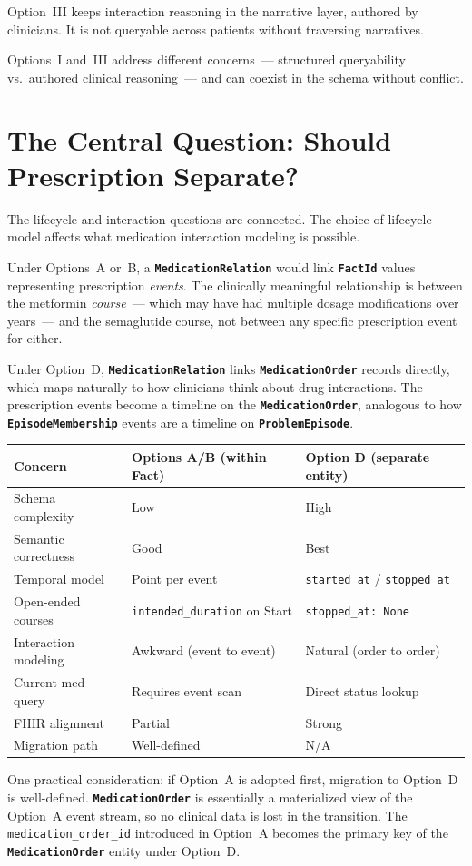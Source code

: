 \documentclass[11pt]{article}
\newcommand{\entity}[1]{\texttt{\textbf{#1}}}
\newcommand{\field}[1]{\texttt{#1}}
\begin{document}
Option~III keeps interaction reasoning in the narrative layer, authored
by clinicians. It is not queryable across patients without traversing
narratives.

Options~I and~III address different concerns~--- structured
queryability vs.\ authored clinical reasoning~--- and can coexist in
the schema without conflict.

\section{The Central Question: Should Prescription Separate?}
\label{sec:separation}

The lifecycle and interaction questions are connected. The choice of
lifecycle model affects what medication interaction modeling is
possible.

Under Options~A or~B, a \entity{MedicationRelation} would link
\entity{FactId} values representing prescription \emph{events}. The
clinically meaningful relationship is between the metformin
\emph{course}~--- which may have had multiple dosage modifications
over years~--- and the semaglutide course, not between any specific
prescription event for either.

Under Option~D, \entity{MedicationRelation} links
\entity{MedicationOrder} records directly, which maps naturally to
how clinicians think about drug interactions. The prescription events
become a timeline on the \entity{MedicationOrder}, analogous to how
\entity{EpisodeMembership} events are a timeline on
\entity{ProblemEpisode}.

\begin{center}
\renewcommand{\arraystretch}{1.4}
\begin{tabular}{p{4.0cm} p{4.0cm} p{4.0cm}}
\toprule
\textbf{Concern} & \textbf{Options A/B (within Fact)} &
  \textbf{Option D (separate entity)} \\
\midrule
Schema complexity      & Low                    & High \\
Semantic correctness   & Good                   & Best \\
Temporal model         & Point per event        & \field{started\_at} / \field{stopped\_at} \\
Open-ended courses     & \field{intended\_duration} on Start & \field{stopped\_at: None} \\
Interaction modeling   & Awkward (event to event) & Natural (order to order) \\
Current med query      & Requires event scan    & Direct status lookup \\
FHIR alignment         & Partial                & Strong \\
Migration path         & Well-defined           & N/A \\
\bottomrule
\end{tabular}
\end{center}

One practical consideration: if Option~A is adopted first, migration
to Option~D is well-defined. \entity{MedicationOrder} is essentially
a materialized view of the Option~A event stream, so no clinical data
is lost in the transition. The \field{medication\_order\_id} introduced
in Option~A becomes the primary key of the \entity{MedicationOrder}
entity under Option~D.
\end{document}
